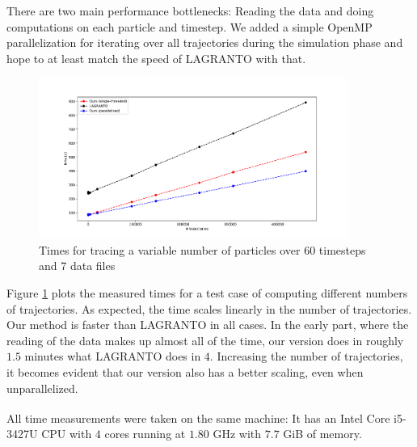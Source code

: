 There are two main performance bottlenecks: Reading the data and doing computations on each particle and timestep. We added a simple OpenMP parallelization for iterating over all trajectories during the simulation phase and hope to at least match the speed of LAGRANTO with that.

\begin{figure}
\centering \includegraphics*[width=0.9\textwidth]{figures/plot_times}
\caption{Times for tracing a variable number of particles over $60$ timesteps and $7$ data files}
\label{fig:plot_time}
\end{figure}

Figure \ref{fig:plot_time} plots the measured times for a test case of computing different numbers of trajectories. As expected, the time scales linearly in the number of trajectories. Our method is faster than LAGRANTO in all cases. In the early part, where the reading of the data makes up almost all of the time, our version does in roughly $1.5$ minutes what LAGRANTO does in $4$. Increasing the number of trajectories, it becomes evident that our version also has a better scaling, even when unparallelized.


All time measurements were taken on the same machine: It has an Intel\textsuperscript{\textregistered} Core\textsuperscript{\texttrademark} i5-3427U CPU with $4$ cores running at $1.80$ GHz with $7.7$ GiB of memory.

